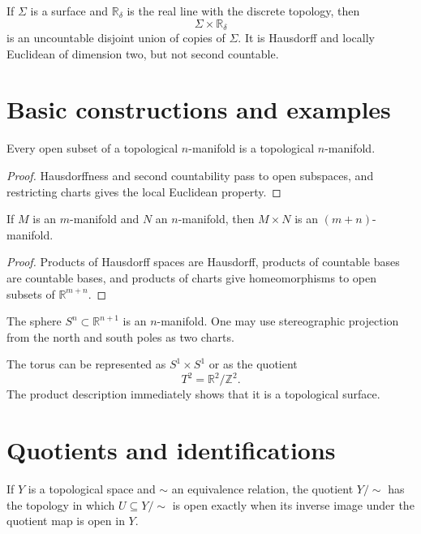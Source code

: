 \begin{example}\label{ex:vii01-uncountable-components}
If \(\Sigma\) is a surface and \(\mathbb R_\delta\) is the real line with the discrete topology, then
\[
\Sigma\times\mathbb R_\delta
\]
is an uncountable disjoint union of copies of \(\Sigma\).  It is Hausdorff and locally Euclidean of dimension two, but not second countable.
\end{example}

\section{Basic constructions and examples}
\begin{proposition}\label{prop:vii01-open-submanifold}
Every open subset of a topological \(n\)-manifold is a topological \(n\)-manifold.
\end{proposition}
\begin{proof}
Hausdorffness and second countability pass to open subspaces, and restricting charts gives the local Euclidean property.
\end{proof}

\begin{proposition}[Products]\label{prop:vii01-products}
If \(M\) is an \(m\)-manifold and \(N\) an \(n\)-manifold, then \(M\times N\) is an \((m+n)\)-manifold.
\end{proposition}
\begin{proof}
Products of Hausdorff spaces are Hausdorff, products of countable bases are countable bases, and products of charts give homeomorphisms to open subsets of \(\mathbb R^{m+n}\).
\end{proof}

\begin{example}[Spheres]\label{ex:vii01-sphere}
The sphere \(S^n\subset\mathbb R^{n+1}\) is an \(n\)-manifold.  One may use stereographic projection from the north and south poles as two charts.
\end{example}

\begin{example}\label{ex:vii01-torus}
The torus can be represented as \(S^1\times S^1\) or as the quotient
\[
T^2=\mathbb R^2/\mathbb Z^2.
\]
The product description immediately shows that it is a topological surface.
\end{example}

\section{Quotients and identifications}
\begin{definition}\label{def:vii01-quotient}
If \(Y\) is a topological space and \(\sim\) an equivalence relation, the quotient \(Y/{\sim}\) has the topology in which \(U\subseteq Y/{\sim}\) is open exactly when its inverse image under the quotient map is open in \(Y\).
\end{definition}

